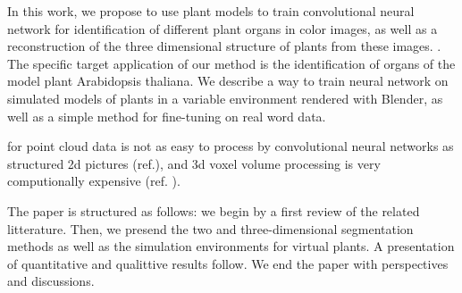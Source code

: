 In this work, we propose to use plant models to train convolutional neural network for
identification of different plant organs in color images, as well as a
reconstruction of the three dimensional structure of plants from these images. .
The specific target application of our method is the identification of organs of the model
plant Arabidopsis thaliana. We describe a way to train neural network on simulated models of
plants in a variable environment rendered with Blender, as well as a simple method for
fine-tuning on real word data. 


 for point cloud data is not as
easy to process by convolutional neural networks as structured 2d pictures
(ref.), and 3d voxel volume processing is very computionally expensive (ref. ).

The paper is structured as follows: we begin by a first review of the related
litterature. Then, we presend the two and three-dimensional segmentation methods
as well as the simulation environments for virtual plants. A presentation of
quantitative and qualittive results follow. We end the paper with perspectives
and discussions.

